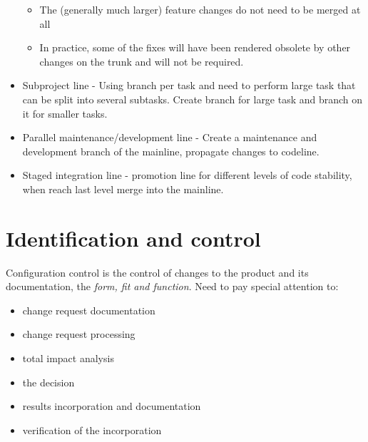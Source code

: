 \begin{itemize}
\begin{itemize}
        \item The (generally much larger) feature changes do not need to be merged at all
        \item In practice, some of the fixes will have been rendered obsolete by other changes on the trunk and will not be required.
    \end{itemize}
    \item Subproject line - Using branch per task and need to perform large task that can be split into several subtasks. Create branch for large task and branch on it for smaller tasks.
    \item Parallel maintenance/development line - Create a maintenance and development branch of the mainline, propagate changes to codeline.
    \item Staged integration line - promotion line for different levels of code stability, when reach last level merge into the mainline.
\end{itemize}

\section{Identification and control}
Configuration control is the control of changes to the product and its documentation, the \textit{form, fit and function}. 
Need to pay special attention to:
\begin{itemize}
    \item change request documentation
    \item change request processing
    \item total impact analysis
    \item the decision
    \item results incorporation and documentation
    \item verification of the incorporation
\end{itemize}

